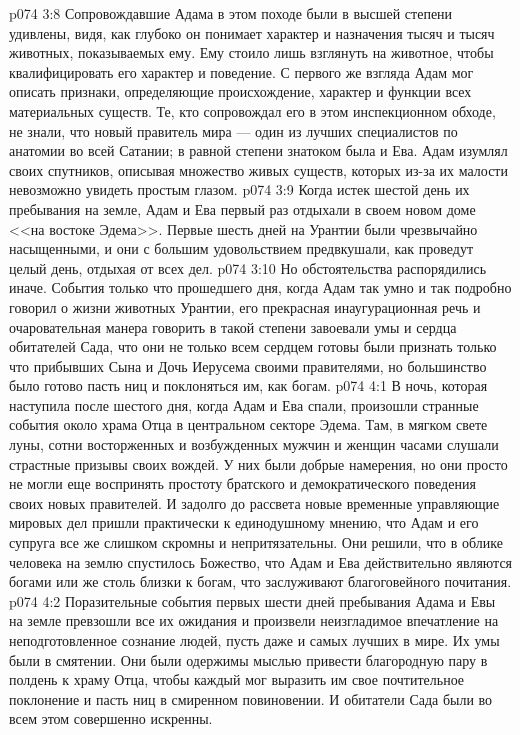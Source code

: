 \vs p074 3:8 Сопровождавшие Адама в этом походе были в высшей степени удивлены, видя, как глубоко он понимает характер и назначения тысяч и тысяч животных, показываемых ему. Ему стоило лишь взглянуть на животное, чтобы квалифицировать его характер и поведение. С первого же взгляда Адам мог описать признаки, определяющие происхождение, характер и функции всех материальных существ. Те, кто сопровождал его в этом инспекционном обходе, не знали, что новый правитель мира --- один из лучших специалистов по анатомии во всей Сатании; в равной степени знатоком была и Ева. Адам изумлял своих спутников, описывая множество живых существ, которых из\hyp{}за их малости невозможно увидеть простым глазом.
\vs p074 3:9 Когда истек шестой день их пребывания на земле, Адам и Ева первый раз отдыхали в своем новом доме <<на востоке Эдема>>. Первые шесть дней на Урантии были чрезвычайно насыщенными, и они с большим удовольствием предвкушали, как проведут целый день, отдыхая от всех дел.
\vs p074 3:10 Но обстоятельства распорядились иначе. События только что прошедшего дня, когда Адам так умно и так подробно говорил о жизни животных Урантии, его прекрасная инаугурационная речь и очаровательная манера говорить в такой степени завоевали умы и сердца обитателей Сада, что они не только всем сердцем готовы были признать только что прибывших Сына и Дочь Иерусема своими правителями, но большинство было готово пасть ниц и поклоняться им, как богам.
\vs p074 4:1 В ночь, которая наступила после шестого дня, когда Адам и Ева спали, произошли странные события около храма Отца в центральном секторе Эдема. Там, в мягком свете луны, сотни восторженных и возбужденных мужчин и женщин часами слушали страстные призывы своих вождей. У них были добрые намерения, но они просто не могли еще воспринять простоту братского и демократического поведения своих новых правителей. И задолго до рассвета новые временные управляющие мировых дел пришли практически к единодушному мнению, что Адам и его супруга все же слишком скромны и непритязательны. Они решили, что в облике человека на землю спустилось Божество, что Адам и Ева действительно являются богами или же столь близки к богам, что заслуживают благоговейного почитания.
\vs p074 4:2 Поразительные события первых шести дней пребывания Адама и Евы на земле превзошли все их ожидания и произвели неизгладимое впечатление на неподготовленное сознание людей, пусть даже и самых лучших в мире. Их умы были в смятении. Они были одержимы мыслью привести благородную пару в полдень к храму Отца, чтобы каждый мог выразить им свое почтительное поклонение и пасть ниц в смиренном повиновении. И обитатели Сада были во всем этом совершенно искренны.
